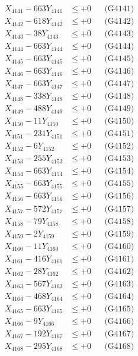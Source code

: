\documentclass[a4paper,10pt]{article}
\begin{document}
{\begin{align}
\allowbreak
X_{4141} - 663Y_{4141} &\leq +0 && \text{(G4141)} \\
X_{4142} - 618Y_{4142} &\leq +0 && \text{(G4142)} \\
X_{4143} - 38Y_{4143} &\leq +0 && \text{(G4143)} \\
X_{4144} - 663Y_{4144} &\leq +0 && \text{(G4144)} \\
X_{4145} - 663Y_{4145} &\leq +0 && \text{(G4145)} \\
X_{4146} - 663Y_{4146} &\leq +0 && \text{(G4146)} \\
X_{4147} - 663Y_{4147} &\leq +0 && \text{(G4147)} \\
X_{4148} - 338Y_{4148} &\leq +0 && \text{(G4148)} \\
X_{4149} - 488Y_{4149} &\leq +0 && \text{(G4149)} \\
X_{4150} - 11Y_{4150} &\leq +0 && \text{(G4150)} \\
\allowbreak
X_{4151} - 231Y_{4151} &\leq +0 && \text{(G4151)} \\
X_{4152} - 6Y_{4152} &\leq +0 && \text{(G4152)} \\
X_{4153} - 255Y_{4153} &\leq +0 && \text{(G4153)} \\
X_{4154} - 663Y_{4154} &\leq +0 && \text{(G4154)} \\
X_{4155} - 663Y_{4155} &\leq +0 && \text{(G4155)} \\
X_{4156} - 663Y_{4156} &\leq +0 && \text{(G4156)} \\
X_{4157} - 572Y_{4157} &\leq +0 && \text{(G4157)} \\
X_{4158} - 79Y_{4158} &\leq +0 && \text{(G4158)} \\
X_{4159} - 2Y_{4159} &\leq +0 && \text{(G4159)} \\
X_{4160} - 11Y_{4160} &\leq +0 && \text{(G4160)} \\
\allowbreak
X_{4161} - 416Y_{4161} &\leq +0 && \text{(G4161)} \\
X_{4162} - 28Y_{4162} &\leq +0 && \text{(G4162)} \\
X_{4163} - 567Y_{4163} &\leq +0 && \text{(G4163)} \\
X_{4164} - 468Y_{4164} &\leq +0 && \text{(G4164)} \\
X_{4165} - 663Y_{4165} &\leq +0 && \text{(G4165)} \\
X_{4166} - 9Y_{4166} &\leq +0 && \text{(G4166)} \\
X_{4167} - 192Y_{4167} &\leq +0 && \text{(G4167)} \\
X_{4168} - 295Y_{4168} &\leq +0 && \text{(G4168)} \\

\end{align}}
\end{document}
